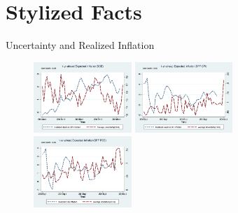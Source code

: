 \documentclass{beamer}
\begin{document}
\section{Stylized Facts}

\begin{frame}{Uncertainty and Realized Inflation}
\begin{figure}
	\centering
\label{InfVar}
\includegraphics[width=0.33\textwidth]{figuresDraft/Inf1yf_CPIAU_varSCEM.png}
\includegraphics[width=0.33\textwidth]{figuresDraft/Inf1yf_CPIAU_varSPFCPIQ.png}
\includegraphics[width=0.33\textwidth]{figuresDraft/Inf1yf_PCE_varSPFPCEQ.png}
\end{figure}
\end{frame}
\end{document}
